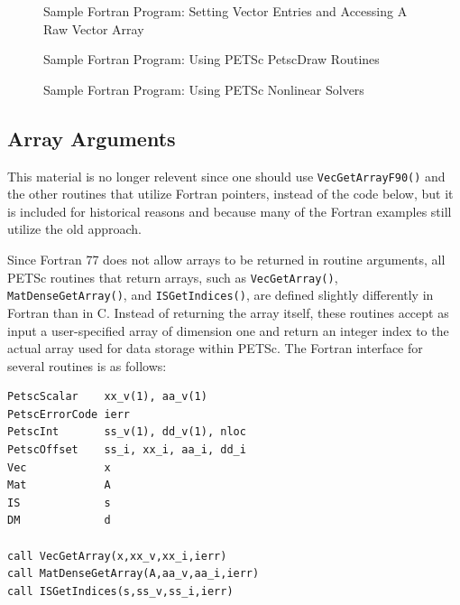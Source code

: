 \begin{figure}[H]
  
\caption{Sample Fortran Program: Setting Vector Entries and Accessing A Raw Vector Array} 
\label{fig_vec2-Fortran}
\end{figure}

\begin{figure}[H]
  
\caption{Sample Fortran Program:  Using PETSc PetscDraw Routines}
\label{fig_draw-Fortran}
\end{figure}

\begin{figure}[H]
  
\caption{Sample Fortran Program:  Using PETSc Nonlinear Solvers}
\label{fig_SNES-Fortran}
\end{figure}

\subsection{Array Arguments}
\label{sec_fortranarrays}

This material is no longer relevent since one should use \lstinline{VecGetArrayF90()} and the other routines that utilize Fortran pointers, instead of the code below, but it is included for historical reasons and because many of the Fortran examples still utilize the old approach.

Since Fortran 77 does not allow arrays to be returned in routine
arguments, all PETSc routines that return arrays, such as
\lstinline{VecGetArray()}, \lstinline{MatDenseGetArray()},
and \lstinline{ISGetIndices()},
are defined slightly differently in Fortran than in C.
Instead of returning the array itself, these routines
accept as input a user-specified array of dimension one and return an
integer index to the actual array used for data storage within PETSc.
The Fortran interface for several routines is as follows:
\begin{lstlisting}
PetscScalar    xx_v(1), aa_v(1)
PetscErrorCode ierr
PetscInt       ss_v(1), dd_v(1), nloc
PetscOffset    ss_i, xx_i, aa_i, dd_i
Vec            x
Mat            A
IS             s
DM             d 

call VecGetArray(x,xx_v,xx_i,ierr)
call MatDenseGetArray(A,aa_v,aa_i,ierr)
call ISGetIndices(s,ss_v,ss_i,ierr)
\end{lstlisting}

